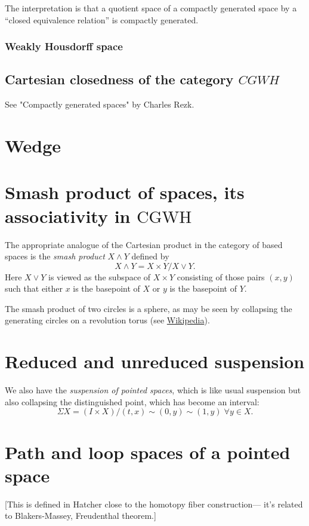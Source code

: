 \noindent
The interpretation is that a quotient space of a 
compactly generated space by a “closed equivalence relation” 
is compactly generated.

\subsubsection{Weakly Housdorff space}

\subsection{Cartesian closedness of the category $CGWH$}
See "Compactly generated spaces" by Charles Rezk.

\section{Wedge}

\section{Smash product of spaces, its associativity in \texorpdfstring{$\text{CGWH}$}{CGWH}}

The appropriate analogue of the Cartesian product in the category of based spaces is the {\it smash product} $X\wedge Y$ defined by
$$X\wedge Y=X\times Y/X\vee Y.$$
Here $X\vee Y$ is viewed as the subspace of $X\times Y$ consisting of those pairs $(x,y)$ such that either $x$ is the basepoint of $X$ or $y$ is the basepoint of $Y$.

\begin{example}
	The smash product of two circles is a sphere, as may be seen by collapsing the generating circles on a revolution torus (see \href{https://en.wikipedia.org/wiki/Smash_product#/media/File:Visualization_of_the_smash_product_of_two_circles.gif}{Wikipedia}).
\end{example}

\section{Reduced and unreduced suspension}
We also have the {\it suspension of pointed spaces}, which is like usual suspension but also collapsing the distinguished point, which has become an interval:
$$\Sigma X=(I\times X)/(t,x)\sim (0,y)\sim (1,y)\;\forall y\in X.$$

\section{Path and loop spaces of a pointed space}
[This is defined in Hatcher close to the homotopy fiber construction--- it's related to Blakers-Massey, Freudenthal theorem.]

